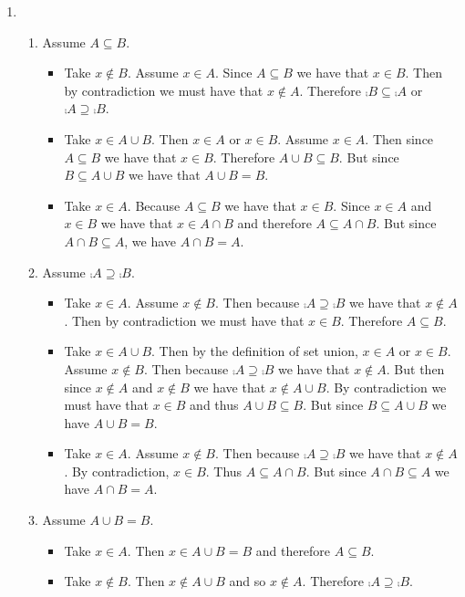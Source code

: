 \documentclass[11pt]{book}
\begin{document}
{\begin{enumerate}
\item \begin{enumerate}
		\item Assume $A \subseteq B$. 
		\begin{itemize}
			\item Take $x \notin B$. Assume $x \in A$. Since $A \subseteq B$ we have that $x \in B$. Then by contradiction we must have that $x \notin A$. Therefore $\comp{B} \subseteq \comp{A}$ or $\comp{A} \supseteq \comp{B}$.
			\item Take $x \in A \cup B$. Then $x \in A$ or $x \in B$. Assume $x \in A$. Then since $A \subseteq B$ we have that $x \in B$. Therefore $A \cup B \subseteq B$. But since $B \subseteq A \cup B$ we have that $A \cup B = B$.
			\item Take $x \in A$. Because $A \subseteq B$ we have that $x \in B$. Since $x \in A$ and $x \in B$ we have that $x \in A \cap B$ and therefore $A \subseteq A \cap B$. But since $A \cap B \subseteq A$, we have $A \cap B = A$.
		\end{itemize}
		\item Assume $\comp{A} \supseteq \comp{B}$.
		\begin{itemize}
		\item Take $x \in A$. Assume $x \notin B$. Then because $\comp{A} \supseteq \comp{B}$ we have that $x \notin A$. Then by contradiction we must have that $x \in B$. Therefore $A \subseteq B$.
		\item Take $x \in A \cup B$. Then by the definition of set union, $x \in A$ or $x \in B$. Assume $x \notin B$. Then because $\comp{A} \supseteq \comp{B}$ we have that $x \notin A$. But then since $x \notin A$ and $x \notin B$ we have that $x \notin A \cup B$. By contradiction we must have that $x \in B$ and thus $A \cup B \subseteq B$. But since $B \subseteq A \cup B$ we have $A \cup B = B$.
		\item Take $x \in A$. Assume $x \notin B$. Then because $\comp{A} \supseteq \comp{B}$ we have that $x \notin A$. By contradiction, $x \in B$. Thus $A \subseteq A \cap B$. But since $A \cap B \subseteq A$ we have $A \cap B = A$.
		\end{itemize}
		\item Assume $A \cup B = B$.
		\begin{itemize}
		\item Take $x \in A$. Then $x \in A \cup B = B$ and therefore $A \subseteq B$.
		\item Take $x \notin B$. Then $x \notin A \cup B$ and so $x \notin A$. Therefore $\comp{A} \supseteq \comp{B}$.

\end{itemize}
\end{enumerate}
\end{enumerate}}
\end{document}
